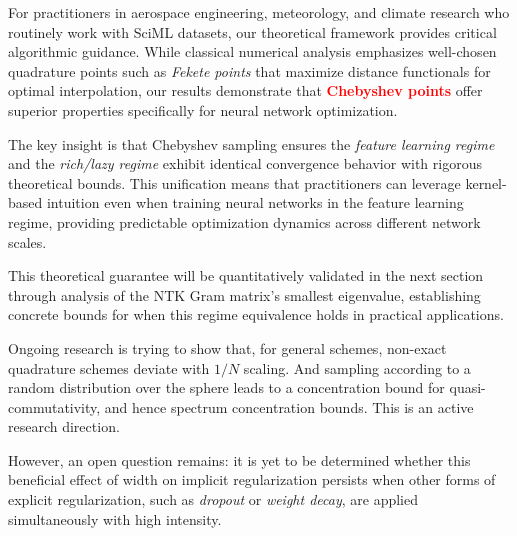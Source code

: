 \documentclass[a4paper]{article}
\theoremstyle{plain}
\theoremstyle{definition}
\theoremstyle{remark}
\begin{document}
\begin{tcolorbox}[colback=green!10,colframe=green!60!black,title={\textbf{Practical Insights for Scientific Machine Learning Applications}},enhanced,drop shadow]
For practitioners in aerospace engineering, meteorology, and climate research who routinely work with SciML datasets, our theoretical framework provides critical algorithmic guidance. While classical numerical analysis emphasizes well-chosen quadrature points such as \textit{Fekete points} that maximize distance functionals for optimal interpolation, our results demonstrate that \textcolor{red}{\textbf{Chebyshev points}} offer superior properties specifically for neural network optimization.

The key insight is that Chebyshev sampling ensures the \textit{feature learning regime} and the \textit{rich/lazy regime} exhibit identical convergence behavior with rigorous theoretical bounds. This unification means that practitioners can leverage kernel-based intuition even when training neural networks in the feature learning regime, providing predictable optimization dynamics across different network scales.

This theoretical guarantee will be quantitatively validated in the next section through analysis of the NTK Gram matrix's smallest eigenvalue, establishing concrete bounds for when this regime equivalence holds in practical applications.
\end{tcolorbox}



\begin{tcolorbox}[colback=green!10,colframe=green!60!black,title={\textbf{Future directions}},enhanced,drop shadow]
    Ongoing research is trying to show that, for general schemes, non-exact quadrature schemes deviate with $1/N$ scaling.
    And sampling according to a random distribution over the sphere leads to a concentration bound for quasi-commutativity, and hence
    spectrum concentration bounds.
    This is an active research direction.
\end{tcolorbox}



\begin{tcolorbox}[colback=green!10,colframe=green!60!black,title={\textbf{Open Question on Regularization Interactions}},enhanced,drop shadow]
    However, an open question remains: it is yet to be determined whether this beneficial effect of width on implicit regularization persists when other forms of explicit regularization, such as \textit{dropout} or \textit{weight decay}, are applied simultaneously with high intensity.
\end{tcolorbox}
\end{document}
